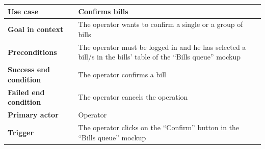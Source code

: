 {{{			\begin{center}
			\begin{tabular}{|p{4cm}|p{10cm}|}
			\hline
				\centering \vspace{1mm} \bfseries{Use case} \vspace{1mm} & 
				\vspace{1mm} Confirms bills\vspace{1mm}\\
			\hline
				\centering \vspace{1mm} \bfseries{Goal in context} \vspace{1mm} & 
				\vspace{1mm} The operator wants to confirm a single or a group of bills  \vspace{1mm}\\
			\hline
				\centering \vspace{1mm} \bfseries{Preconditions} \vspace{1mm} & 
				\vspace{1mm} The operator must be logged in and he has selected a bill/s in the bills’ table of the “Bills queue” mockup\vspace{1mm}\\
			\hline
				\centering \vspace{1mm} \bfseries{Success end condition} \vspace{1mm} & 
				\vspace{1mm} The operator confirms a bill\vspace{1mm}\\
			\hline
				\centering \vspace{1mm} \bfseries{Failed end condition} \vspace{1mm} & 
				\vspace{1mm} The operator cancels the operation\vspace{1mm}\\
			\hline
				\centering \vspace{1mm} \bfseries{Primary actor} \vspace{1mm} & 
				\vspace{1mm} Operator \vspace{1mm}\\
			\hline
				\centering \vspace{1mm} \bfseries{Trigger} \vspace{1mm} & 
				\vspace{1mm} The operator clicks on the “Confirm” button in the “Bills queue” mockup\vspace{1mm}\\
			\hline
			\end{tabular}


\end{center}}}}
